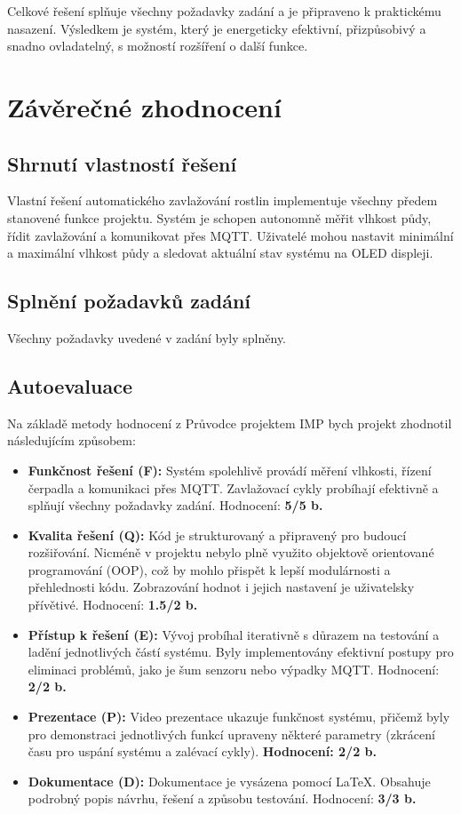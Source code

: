\documentclass[a4paper, 11pt]{article}
\begin{document}
Celkové řešení splňuje všechny požadavky zadání a je připraveno k praktickému nasazení. Výsledkem je systém, který je energeticky efektivní, 
přizpůsobivý a snadno ovladatelný, s možností rozšíření o další funkce.

\section{Závěrečné zhodnocení}

\subsection{Shrnutí vlastností řešení}

Vlastní řešení automatického zavlažování rostlin implementuje všechny předem stanovené funkce projektu. 
Systém je schopen autonomně měřit vlhkost půdy, řídit zavlažování a komunikovat přes MQTT. 
Uživatelé mohou nastavit minimální a maximální vlhkost půdy a sledovat aktuální stav systému na OLED displeji.

\subsection{Splnění požadavků zadání}

Všechny požadavky uvedené v zadání byly splněny.

\subsection{Autoevaluace}

Na základě metody hodnocení z Průvodce projektem IMP\cite{pruvodce_projektem_imp} bych projekt zhodnotil následujícím způsobem:
\begin{itemize}
    \item \textbf{Funkčnost řešení (F):} Systém spolehlivě provádí měření vlhkosti, řízení čerpadla a komunikaci přes MQTT. Zavlažovací cykly probíhají efektivně a splňují všechny požadavky zadání. Hodnocení: \textbf{5/5 b.}
    \item \textbf{Kvalita řešení (Q):} Kód je strukturovaný a připravený pro budoucí rozšiřování. Nicméně v projektu nebylo plně využito objektově orientované programování (OOP), což by mohlo přispět k lepší modulárnosti a přehlednosti kódu. Zobrazování hodnot i jejich nastavení je uživatelsky přívětivé. Hodnocení: \textbf{1.5/2 b.}
    \item \textbf{Přístup k řešení (E):} Vývoj probíhal iterativně s důrazem na testování a ladění jednotlivých částí systému. Byly implementovány efektivní postupy pro eliminaci problémů, jako je šum senzoru nebo výpadky MQTT. Hodnocení: \textbf{2/2 b.}
    \item \textbf{Prezentace (P):} Video prezentace ukazuje funkčnost systému, přičemž byly pro demonstraci jednotlivých funkcí upraveny některé parametry (zkrácení času pro uspání systému a zalévací cykly). \textbf{Hodnocení: 2/2 b.}
    \item \textbf{Dokumentace (D):} Dokumentace je vysázena pomocí \LaTeX. Obsahuje podrobný popis návrhu, řešení a způsobu testování. Hodnocení: \textbf{3/3 b.}
\end{itemize}
\end{document}
